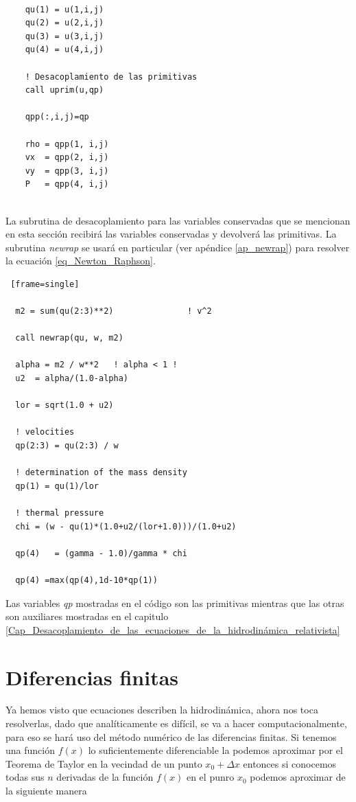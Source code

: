 \documentclass[12pt,a4paper]{book}
\begin{document}
\begin{lstlisting}[frame=single] 
        
    qu(1) = u(1,i,j)
    qu(2) = u(2,i,j)
    qu(3) = u(3,i,j)
    qu(4) = u(4,i,j)

    ! Desacoplamiento de las primitivas
    call uprim(u,qp)

    qpp(:,i,j)=qp

    rho = qpp(1, i,j)
    vx  = qpp(2, i,j)
    vy  = qpp(3, i,j)
    P   = qpp(4, i,j)


\end{lstlisting}

La subrutina de desacoplamiento para las variables conservadas que se mencionan en esta sección recibirá las variables conservadas
y devolverá las primitivas. La subrutina \emph{newrap} se usará en particular 
(ver apéndice \ref{ap_newrap}) para resolver la ecuación \ref{eq_Newton_Raphson}.

\begin{lstlisting} [frame=single]
  
  m2 = sum(qu(2:3)**2)               ! v^2

  call newrap(qu, w, m2)

  alpha = m2 / w**2   ! alpha < 1 !
  u2  = alpha/(1.0-alpha)

  lor = sqrt(1.0 + u2)

  ! velocities
  qp(2:3) = qu(2:3) / w

  ! determination of the mass density
  qp(1) = qu(1)/lor

  ! thermal pressure
  chi = (w - qu(1)*(1.0+u2/(lor+1.0)))/(1.0+u2)

  qp(4)   = (gamma - 1.0)/gamma * chi

  qp(4) =max(qp(4),1d-10*qp(1))
\end{lstlisting}

Las variables \emph{qp} mostradas en el código son las primitivas mientras que las otras son auxiliares mostradas en el capitulo 
\ref{Cap_Desacoplamiento_de_las_ecuaciones_de_la_hidrodinámica_relativista}


\section{Diferencias finitas} \label{sec:Diferencias_finitas}
Ya hemos visto que ecuaciones describen la hidrodinámica, ahora nos toca resolverlas, dado que analíticamente es difícil, se va a hacer computacionalmente, para 
eso se hará uso del método numérico de las diferencias finitas.
Si tenemos una función $f(x)$ lo suficientemente diferenciable la podemos aproximar por el Teorema de Taylor  en la vecindad de un punto $x_0+\Delta x$ entonces si conocemos todas sus $n$ derivadas de la función $f(x)$ en el punro $x_0$ podemos aproximar de la siguiente manera
\end{document}
